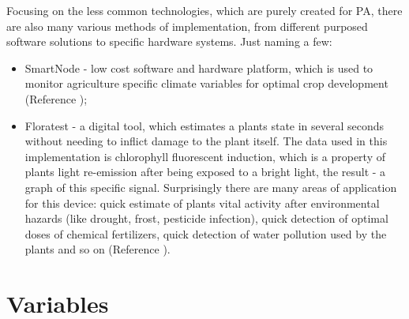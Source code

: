 \documentclass[11pt,a5paper,footinclude=true,headinclude=true, oneside]{scrbook}
\begin{document}
Focusing on the less common technologies, which are purely created for PA, there are also many various methods of implementation, from different purposed software solutions to specific hardware systems. Just naming a few:

\begin{itemize}
    \item SmartNode - low cost software and hardware platform, which is used to monitor agriculture specific climate variables for optimal crop development (Reference \cite{nunez_v_design_2017});
    \item Floratest - a digital tool, which estimates a plants state in several seconds without needing to inflict damage to the plant itself. The data used in this implementation is chlorophyll fluorescent induction, which is a property of plants light re-emission after being exposed to a bright light, the result - a graph of this specific signal. Surprisingly there are many areas of application for this device: quick estimate of plants vital activity after environmental hazards (like drought, frost, pesticide infection), quick detection of optimal doses of chemical fertilizers, quick detection of water pollution used by the plants and so on (Reference \cite{palagin_data_2011}).
\end{itemize}

    
\section{Variables}
\end{document}
